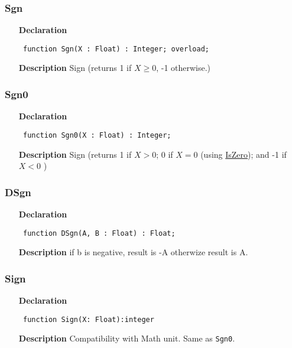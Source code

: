 \documentclass[12pt,a4paper,oneside]{report}
\newcommand{\lmath}[1]{   %
	\marginpar{\vspace{#1} 
		\begin{flushright}
			LMath
	\end{flushright} }
}
\newcommand{\declarationitem}[1]{\textbf{#1}}
\newcommand{\descriptiontitle}[1]{\textbf{#1}}
\newcommand{\code}[1]{\texttt{#1}}
\begin{document}
\subsubsection{Sgn}
\label{uminmax-Sgn}
\begin{itemize}\item[\declarationitem{Declaration}\hfill]
	\begin{flushleft}
		\code{
			function Sgn(X : Float) : Integer; overload;}
	\end{flushleft}
	\item[\descriptiontitle{Description}]
	Sign (returns 1 if $X\ge 0$, -1 otherwise.)
\end{itemize}
\subsubsection{Sgn0}
\label{uminmax-Sgn0}
\begin{itemize}\item[\declarationitem{Declaration}\hfill]
	\begin{flushleft}
		\code{
			function Sgn0(X : Float) : Integer;}
	\end{flushleft}
	\item[\descriptiontitle{Description}]
	Sign (returns 1 if $X > 0$; 0 if $X=0$ (using \hyperref[utypes-IsZero]{IsZero}); and -1 if $X < 0$ )	
\end{itemize}
\subsubsection{DSgn}
\label{uminmax-DSgn}
\begin{itemize}\item[\declarationitem{Declaration}\hfill]
	\begin{flushleft}
		\code{
			function DSgn(A, B : Float) : Float;}
	\end{flushleft}
	\par
	\item[\descriptiontitle{Description}]
	 if b is negative, result is -A otherwize result is A.
\end{itemize}
\subsubsection{Sign}
\lmath{-24pt}
\label{uminmax-Sign}
\begin{itemize}\item[\declarationitem{Declaration}\hfill]
	\begin{flushleft}
		\code{
			function Sign(X: Float):integer}
	\end{flushleft}
	\item[\descriptiontitle{Description}]
	Compatibility with Math unit. Same as \code{Sgn0}. 
\end{itemize}
\end{document}
